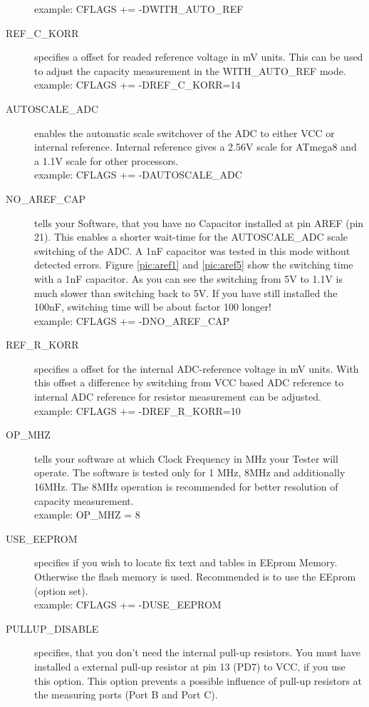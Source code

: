 \begin{description}
example:  CFLAGS += -DWITH\_AUTO\_REF
  \item[REF\_C\_KORR] specifies a offset for readed reference voltage in mV units.
This can be used to adjust the capacity measurement in the WITH\_AUTO\_REF mode.\\
example:  CFLAGS += -DREF\_C\_KORR=14
  \item[AUTOSCALE\_ADC] enables the automatic scale switchover of the ADC to either VCC or internal reference.
Internal reference gives a 2.56V scale for ATmega8 and a 1.1V scale for other processors.\\
example: CFLAGS += -DAUTOSCALE\_ADC
  \item[NO\_AREF\_CAP] tells your Software, that you have no Capacitor installed at pin AREF (pin 21).
This enables a shorter wait-time for the AUTOSCALE\_ADC scale switching of the ADC.
A 1nF capacitor was tested in this mode without detected errors.
Figure \ref{pic:aref1} and \ref{pic:aref5} show the switching time with a 1nF capacitor.
As you can see the switching from 5V to 1.1V is much slower than switching back to 5V. If you
have still installed the 100nF, switching time will be about factor 100 longer!\\
example: CFLAGS += -DNO\_AREF\_CAP
  \item[REF\_R\_KORR] specifies a offset for the internal ADC-reference voltage in mV units.
With this offset a difference by switching from VCC based ADC reference to internal ADC reference for resistor measurement can be adjusted.\\
example: CFLAGS += -DREF\_R\_KORR=10
  \item[OP\_MHZ] tells your software at which Clock Frequency in MHz your Tester will operate.
The software is tested only for 1 MHz, 8MHz and additionally 16MHz. The 8MHz operation is recommended for better resolution of capacity measurement.\\
example: OP\_MHZ = 8
  \item[USE\_EEPROM] specifies if you wish to locate fix text and tables in EEprom Memory. Otherwise the flash memory is used.
Recommended is to use the EEprom (option set).\\
example: CFLAGS += -DUSE\_EEPROM
  \item[PULLUP\_DISABLE] specifies, that you don't need the internal pull-up resistors.
 You must have installed a external pull-up resistor at pin 13 (PD7) to VCC, if you use this option.
This option prevents a possible influence of pull-up resistors at the measuring ports (Port B and Port C).\\

\end{description}
